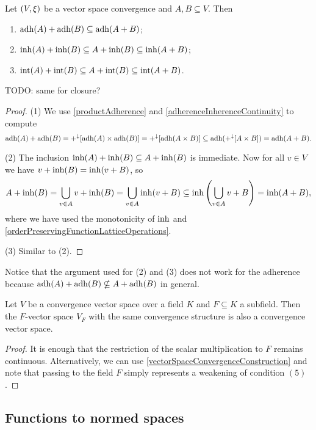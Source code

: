 \begin{proposition} \label{vectorSumInherenceAdherence}
Let $\left( V,\xi \right)$ be a vector space convergence and $A,B\subseteq V$. Then
\begin{enumerate}
\item $\operatorname{adh}(A)+\operatorname{adh}(B) \subseteq \operatorname{adh}(A+B)$;
\item $\operatorname{inh}(A)+\operatorname{inh}(B) \subseteq A+\operatorname{inh}(B) \subseteq \operatorname{inh}(A+B)$;
\item $\operatorname{int}(A)+\operatorname{int}(B) \subseteq A+\operatorname{int}(B) \subseteq \operatorname{int}(A+B)$.
\end{enumerate}
\end{proposition}
TODO: same for closure?
\begin{proof}
(1) We use \ref{productAdherence} and \ref{adherenceInherenceContinuity} to compute
\[ \operatorname{adh}(A)+\operatorname{adh}(B) = +^\downarrow[\operatorname{adh}(A)\times\operatorname{adh}(B)] = +^\downarrow[\operatorname{adh}(A\times B)] \subseteq \operatorname{adh}(+^\downarrow[A\times B]) = \operatorname{adh}(A+B). \]

(2) The inclusion $\operatorname{inh}(A)+\operatorname{inh}(B) \subseteq A+\operatorname{inh}(B)$ is immediate. Now for all $v\in V$ we have $v+\operatorname{inh}(B) = \operatorname{inh}(v+B)$, so
\[ A+\operatorname{inh}(B) = \bigcup_{v\in A}v+\operatorname{inh}(B) = \bigcup_{v\in A}\operatorname{inh}(v+B) \subseteq \operatorname{inh}\left(\bigcup_{v\in A} v+B\right) = \operatorname{inh}(A+B), \]
where we have used the monotonicity of $\operatorname{inh}$ and \ref{orderPreservingFunctionLatticeOperations}.

(3) Similar to (2).
\end{proof}
Notice that the argument used for (2) and (3) does not work for the adherence because $\operatorname{adh}(A)+\operatorname{adh}(B) \nsubseteq A+\operatorname{adh}(B)$ in general.

\begin{lemma}
Let $V$ be a convergence vector space over a field $K$ and $F\subseteq K$ a subfield. Then the $F$-vector space $V_F$ with the same convergence structure is also a convergence vector space.
\end{lemma}
\begin{proof}
It is enough that the restriction of the scalar multiplication to $F$ remains continuous. Alternatively, we can use \ref{vectorSpaceConvergenceConstruction} and note that passing to the field $F$ simply represents a weakening of condition $(5)$.
\end{proof}

\subsection{Functions to normed spaces}

